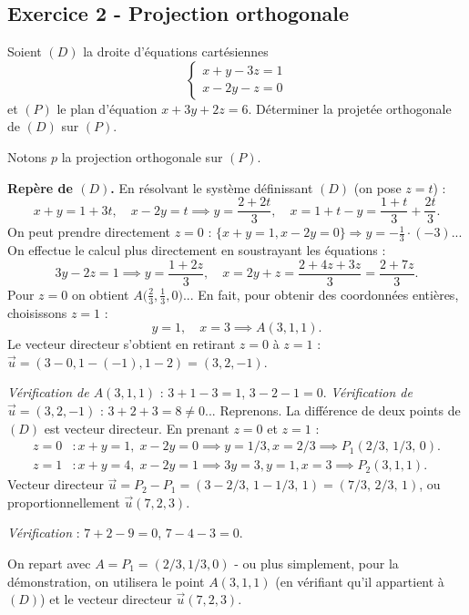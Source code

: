\documentclass[12pt,a4paper]{article}
\begin{document}
\subsection*{Exercice 2 - Projection orthogonale \niveau{\moyen}}

\begin{boiteexercice}
Soient $(D)$ la droite d'équations cartésiennes
\[
  \begin{cases} x+y-3z = 1 \\ x-2y-z = 0 \end{cases}
\]
et $(P)$ le plan d'équation $x+3y+2z=6$. Déterminer la projetée orthogonale de $(D)$ sur $(P)$.
\end{boiteexercice}

\begin{boitecorrige}
Notons $p$ la projection orthogonale sur $(P)$.

\textbf{Repère de $(D)$.}
En résolvant le système définissant $(D)$ (on pose $z=t$) :
\[
  x+y = 1+3t, \quad x-2y = t \implies y = \frac{2+2t}{3}, \quad x = 1+t - y = \frac{1+t}{3}+\frac{2t}{3}.
\]
On peut prendre directement $z=0$ : $\{x+y=1, x-2y=0\} \Rightarrow y=-\tfrac{1}{3}\cdot(-3)$... On
effectue le calcul plus directement en soustrayant les équations :
\[
  3y - 2z = 1 \implies y = \frac{1+2z}{3}, \quad x = 2y+z = \frac{2+4z+3z}{3} = \frac{2+7z}{3}.
\]
Pour $z=0$ on obtient $A\bigl(\tfrac{2}{3}, \tfrac{1}{3}, 0\bigr)$... En fait, pour obtenir des
coordonnées entières, choisissons $z=1$ :
\[
  y = 1, \quad x = 3 \implies A(3,1,1).
\]
Le vecteur directeur s'obtient en retirant $z=0$ à $z=1$ : $\vec{u} = (3-0, 1-(-1), 1-2) = (3,2,-1)$.

\textit{Vérification de $A(3,1,1)$} : $3+1-3=1$, $3-2-1=0$.
\textit{Vérification de $\vec{u}=(3,2,-1)$} : $3+2+3=8\neq0$... Reprenons. La différence de deux
points de $(D)$ est vecteur directeur. En prenant $z=0$ et $z=1$ :
\begin{align*}
  z=0 &: x+y=1,\; x-2y=0 \implies y=1/3, x=2/3 \implies P_1(2/3,\,1/3,\,0).\\
  z=1 &: x+y=4,\; x-2y=1 \implies 3y=3, y=1, x=3 \implies P_2(3,1,1).
\end{align*}
Vecteur directeur $\vec{u} = P_2 - P_1 = (3-2/3,\,1-1/3,\,1) = (7/3,\,2/3,\,1)$, ou proportionnellement
$\vec{u}(7,2,3)$.

\textit{Vérification} : $7+2-9=0$, $7-4-3=0$.

On repart avec $A = P_1 = (2/3, 1/3, 0)$ - ou plus simplement, pour la démonstration, on utilisera
le point $A(3,1,1)$ (en vérifiant qu'il appartient à $(D)$) et le vecteur directeur $\vec{u}(7,2,3)$.


\end{boitecorrige}
\end{document}
